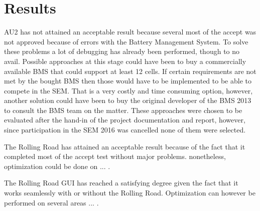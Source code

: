 \chapter{Results}
AU2 has not attained an acceptable result because several most of the accept was not approved because of errors with the Battery Management System. To solve these problems a lot of debugging has already been performed, though to no avail. Possible approaches at this stage could have been to buy a commercially available  BMS that could support at least 12 cells. If certain requirements are not met by the bought BMS then those would have to be implemented to be able to compete in the SEM. That is a very costly and time consuming option, however, another solution could have been to buy the original developer of the BMS 2013 to consult the BMS team on the matter. These approaches were chosen to be evaluated after the hand-in of the project documentation and report, however, since participation in the SEM 2016 was cancelled none of them were selected.

The Rolling Road has attained an acceptable result because of the fact that it completed most of the accept test without major problems. nonetheless, optimization could be done on ... .

The Rolling Road GUI has reached a satisfying degree given the fact that it works seamlessly with or without the Rolling Road. Optimization can however be performed on several areas ... .

